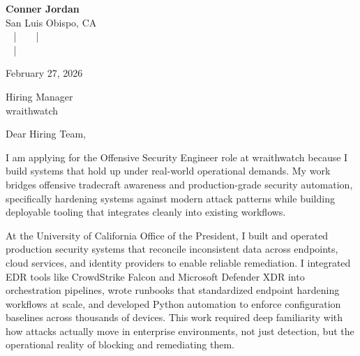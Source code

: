 \documentclass[letterpaper,11pt]{article}
\newcommand{\companyname}{wraithwatch}
\begin{document}
\begin{center}
  {\Huge \textbf{Conner Jordan}}\\[4pt]
  {\Large San Luis Obispo, CA}\\[4pt]
  \href{tel:+18059759793}{
    } ~ | ~
  \href{mailto:connercharlesjordan@gmail.com}{
    } ~ | ~
   \\
  \href{https://www.linkedin.com/in/conner-jordan-4b268514a/}{
    } ~ | ~
  \href{https://github.com/cjordan223}{
    }
\end{center}

\vspace{16pt}

\begin{flushright}
February 27, 2026
\end{flushright}

Hiring Manager\\
\companyname

\vspace{26pt}

\noindent
Dear Hiring Team,

\vspace{16pt}

I am applying for the Offensive Security Engineer role at wraithwatch because I build systems that hold up under real-world operational demands. My work bridges offensive tradecraft awareness and production-grade security automation, specifically hardening systems against modern attack patterns while building deployable tooling that integrates cleanly into existing workflows.

\vspace{16pt}

At the University of California Office of the President, I built and operated production security systems that reconcile inconsistent data across endpoints, cloud services, and identity providers to enable reliable remediation. I integrated EDR tools like CrowdStrike Falcon and Microsoft Defender XDR into orchestration pipelines, wrote runbooks that standardized endpoint hardening workflows at scale, and developed Python automation to enforce configuration baselines across thousands of devices. This work required deep familiarity with how attacks actually move in enterprise environments, not just detection, but the operational reality of blocking and remediating them.
\end{document}
